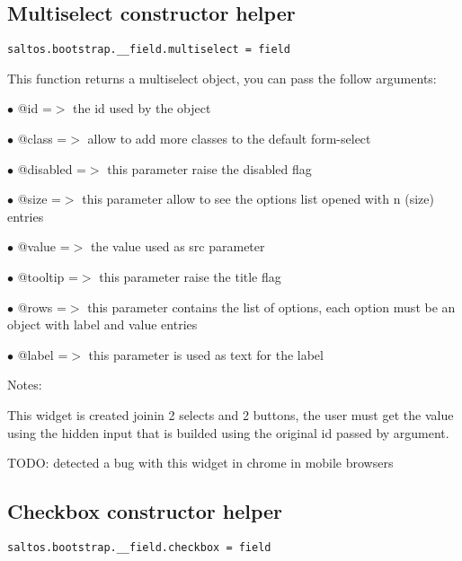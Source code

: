 \documentclass[a4paper]{book}
\begin{document}
\hypertarget{toc448}{}
\subsection{Multiselect constructor helper}

\begin{lstlisting}
saltos.bootstrap.__field.multiselect = field
\end{lstlisting}

This function returns a multiselect object, you can pass the follow arguments:

\begin{compactitem}
\item[\color{myblue}$\bullet$] @id       =$>$ the id used by the object
\item[\color{myblue}$\bullet$] @class    =$>$ allow to add more classes to the default form-select
\item[\color{myblue}$\bullet$] @disabled =$>$ this parameter raise the disabled flag
\item[\color{myblue}$\bullet$] @size     =$>$ this parameter allow to see the options list opened with n (size) entries
\item[\color{myblue}$\bullet$] @value    =$>$ the value used as src parameter
\item[\color{myblue}$\bullet$] @tooltip  =$>$ this parameter raise the title flag
\item[\color{myblue}$\bullet$] @rows     =$>$ this parameter contains the list of options, each option must be an object
             with label and value entries
\item[\color{myblue}$\bullet$] @label    =$>$ this parameter is used as text for the label
\end{compactitem}

Notes:

This widget is created joinin 2 selects and 2 buttons, the user must get the value
using the hidden input that is builded using the original id passed by argument.

TODO: detected a bug with this widget in chrome in mobile browsers

\hypertarget{toc449}{}
\subsection{Checkbox constructor helper}

\begin{lstlisting}
saltos.bootstrap.__field.checkbox = field
\end{lstlisting}
\end{document}
